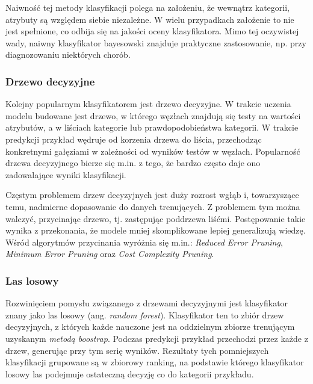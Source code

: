 \documentclass[../thesis.tex]{subfiles}
\begin{document}
Naiwność tej metody klasyfikacji polega na założeniu, że wewnątrz kategorii, atrybuty są względem siebie niezależne. W wielu przypadkach założenie to nie jest spełnione, co odbija się na jakości oceny klasyfikatora. Mimo tej oczywistej wady, naiwny klasyfikator bayesowski znajduje praktyczne zastosowanie, np. przy diagnozowaniu niektórych chorób.

\subsubsection{Drzewo decyzyjne}

Kolejny popularnym klasyfikatorem jest drzewo decyzyjne. W trakcie uczenia modelu budowane jest drzewo, w którego węzłach znajdują się testy na wartości atrybutów, a w liściach kategorie lub prawdopodobieństwa kategorii. W trakcie predykcji przykład wędruje od korzenia drzewa do liścia, przechodząc konkretnymi gałęziami w zależności od wyników testów w węzłach. Popularność drzewa decyzyjnego bierze się m.in. z tego, że bardzo często daje ono zadowalające wyniki klasyfikacji. 

Częstym problemem drzew decyzyjnych jest duży rozrost wgłąb i, towarzyszące temu, nadmierne dopasowanie do danych trenujących. Z problemem tym można walczyć, przycinając drzewo, tj. zastępując poddrzewa liśćmi. Postępowanie takie wynika z przekonania, że modele mniej skomplikowane lepiej generalizują wiedzę. Wśród algorytmów przycinania wyróżnia się m.in.: \emph{Reduced Error Pruning}, \emph{Minimum Error Pruning} oraz \emph{Cost Complexity Pruning}.

\subsubsection{Las losowy}

Rozwinięciem pomysłu związanego z drzewami decyzyjnymi jest klasyfikator znany jako las losowy (ang. \emph{random forest}). Klasyfikator ten to zbiór drzew decyzyjnych, z których każde nauczone jest na oddzielnym zbiorze trenującym uzyskanym \emph{metodą boostrap}. Podczas predykcji przykład przechodzi przez każde z drzew, generując przy tym serię wyników. Rezultaty tych pomniejszych klasyfikacji grupowane są w zbiorowy ranking, na podstawie którego klasyfikator losowy las podejmuje ostateczną decyzję co do kategorii przykładu.
\end{document}
